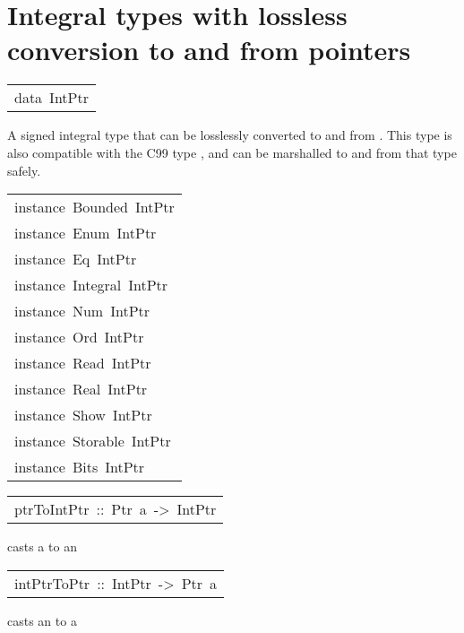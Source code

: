 \section{Integral types with lossless conversion to and from pointers
}
\begin{haddockdesc}
\item[\begin{tabular}{@{}l}
data\ IntPtr
\end{tabular}]\haddockbegindoc
A signed integral type that can be losslessly converted to and from
 .  This type is also compatible with the C99 type , and
 can be marshalled to and from that type safely.
\par

\end{haddockdesc}
\begin{haddockdesc}
\item[\begin{tabular}{@{}l}
instance\ Bounded\ IntPtr\\instance\ Enum\ IntPtr\\instance\ Eq\ IntPtr\\instance\ Integral\ IntPtr\\instance\ Num\ IntPtr\\instance\ Ord\ IntPtr\\instance\ Read\ IntPtr\\instance\ Real\ IntPtr\\instance\ Show\ IntPtr\\instance\ Storable\ IntPtr\\instance\ Bits\ IntPtr
\end{tabular}]
\end{haddockdesc}
\begin{haddockdesc}
\item[\begin{tabular}{@{}l}
ptrToIntPtr\ ::\ Ptr\ a\ ->\ IntPtr
\end{tabular}]\haddockbegindoc
casts a  to an 
\par

\end{haddockdesc}
\begin{haddockdesc}
\item[\begin{tabular}{@{}l}
intPtrToPtr\ ::\ IntPtr\ ->\ Ptr\ a
\end{tabular}]\haddockbegindoc
casts an  to a 
\par

\end{haddockdesc}
